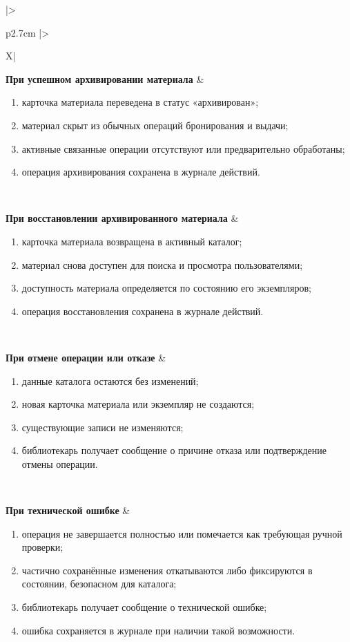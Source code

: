 \documentclass[12pt,a4paper]{article}
\begin{document}
\begin{xltabular}{\textwidth}{
				|>{\raggedright\arraybackslash}p{2.7cm}
				|>{\raggedright\arraybackslash}X|
			}
			\textbf{При успешном архивировании материала} &
			\begin{enumerate}
				\item карточка материала переведена в статус «архивирован»;
				\item материал скрыт из обычных операций бронирования и выдачи;
				\item активные связанные операции отсутствуют или предварительно
				обработаны;
				\item операция архивирования сохранена в журнале действий.
			\end{enumerate} \\
			\hline
			
			\textbf{При восстановлении архивированного материала} &
			\begin{enumerate}
				\item карточка материала возвращена в активный каталог;
				\item материал снова доступен для поиска и просмотра пользователями;
				\item доступность материала определяется по состоянию его экземпляров;
				\item операция восстановления сохранена в журнале действий.
			\end{enumerate} \\
			\hline
			
			\textbf{При отмене операции или отказе} &
			\begin{enumerate}
				\item данные каталога остаются без изменений;
				\item новая карточка материала или экземпляр не создаются;
				\item существующие записи не изменяются;
				\item библиотекарь получает сообщение о причине отказа или подтверждение
				отмены операции.
			\end{enumerate} \\
			\hline
			
			\textbf{При технической ошибке} &
			\begin{enumerate}
				\item операция не завершается полностью или помечается как требующая
				ручной проверки;
				\item частично сохранённые изменения откатываются либо фиксируются в
				состоянии, безопасном для каталога;
				\item библиотекарь получает сообщение о технической ошибке;
				\item ошибка сохраняется в журнале при наличии такой возможности.
			\end{enumerate} \\
			\hline
			
		\end{xltabular}
		
\end{document}
